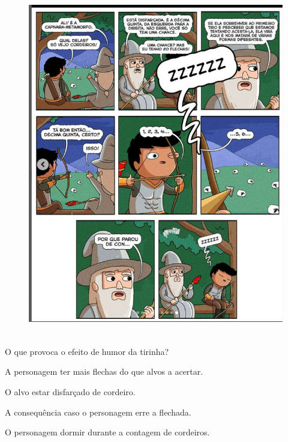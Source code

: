 \begin{figure}[H]
\centering\includegraphics[width=4.77759in,height=5.95in]{./imgSAEB_6_POR/media/image50.png}
\end{figure}

O que provoca o efeito de humor da tirinha?

\begin{escolha}
\item A personagem ter mais flechas do que alvos a acertar.
\item O alvo estar disfarçado de cordeiro.
\item A consequência caso o personagem erre a flechada.
\item O personagem dormir durante a contagem de cordeiros.
\end{escolha}



